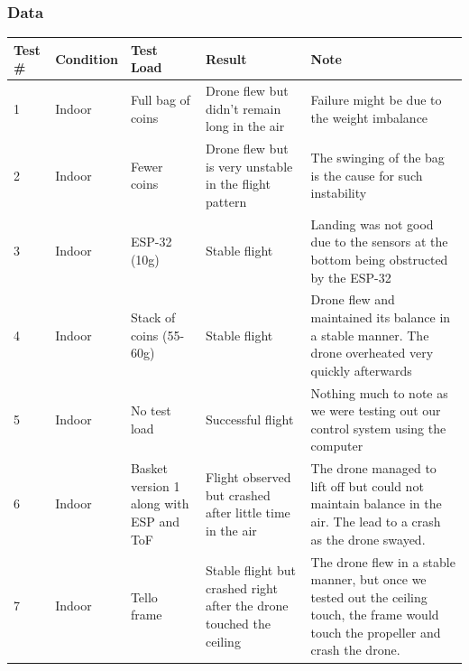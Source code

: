 \documentclass[12pt]{article}
\begin{document}
            \subsubsection*{Data}
            \begin{longtable}{ | m{1.5cm} | m{2cm}| m{3cm} | m{4cm} | m{4cm} |}
                \hline
                Test \# & Condition & Test Load & Result & Note \\\hline

                1 & Indoor &
                Full bag of coins &
                Drone flew but didn't remain long in the air &
                Failure might be due to the weight imbalance \\\hline

                2 & Indoor &
                Fewer coins &
                Drone flew but is very unstable in the flight pattern &
                The swinging of the bag is the cause for such instability \\\hline

                3 & Indoor &
                ESP-32 (10g) &
                Stable flight &
                Landing was not good due to the sensors at the bottom being obstructed by the ESP-32 \\\hline

                4 & Indoor &
                Stack of coins (55-60g) &
                Stable flight &
                Drone flew and maintained its balance in a stable manner. The drone overheated very quickly afterwards \\\hline

                5 & Indoor &
                No test load &
                Successful flight &
                Nothing much to note as we were testing out our control system using the computer \\\hline

                6 & Indoor &
                Basket version 1 along with ESP and ToF &
                Flight observed but crashed after little time in the air &
                The drone managed to lift off but could not maintain balance in the air. The lead to a crash as the drone swayed. \\\hline

                7 & Indoor &
                Tello frame &
                Stable flight but crashed right after the drone touched the ceiling &
                The drone flew in a stable manner, but once we tested out the ceiling touch, the frame would touch the propeller and crash the drone. \\\hline


\end{longtable}
\end{document}
